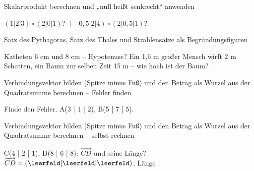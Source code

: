 \begin{aufgabe}{Skalarprodukt berechnen und „null heißt senkrecht“ anwenden}
\begin{teile}
\teil $(1 | 2 | 3) \circ (2 | 0 | 1)$? \leerfeld
\teil $(-0{,}5 | 2 | 4) \circ (2 | 0{,}5 | 1)$? \leerfeld
\end{teile}
\end{aufgabe}

\begin{aufgabe}{Satz des Pythagoras, Satz des Thales und Strahlensätze als Begründungsfiguren}
\begin{teile}
\teil Katheten 6 cm und 8 cm – Hypotenuse? \leerfeld[cm]
\teil Ein 1,6 m großer Mensch wirft 2 m Schatten, ein Baum zur selben Zeit 15 m – wie hoch ist der Baum? \leerfeld[m]
\end{teile}
\end{aufgabe}

\begin{aufgabe}{Verbindungsvektor bilden (Spitze minus Fuß) und den Betrag als Wurzel aus der Quadratsumme berechnen – Fehler finden}
\begin{teile}
\teil Finde den Fehler. A(3 | 1 | 2), B(5 | 7 | 5). 
\end{teile}
\end{aufgabe}

\begin{aufgabe}{Verbindungsvektor bilden (Spitze minus Fuß) und den Betrag als Wurzel aus der Quadratsumme berechnen – selbst rechnen}
\begin{teile}
\teil C(4 | 2 | 1), D(8 | 6 | 8): $\overrightarrow{CD}$ und seine Länge? $\overrightarrow{CD} = ( \leerfeld | \leerfeld | \leerfeld )$, Länge \leerfeld
\end{teile}
\end{aufgabe}
